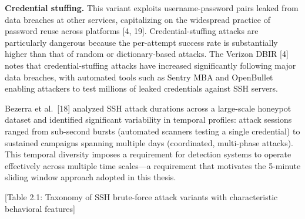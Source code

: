 \documentclass[
  a4paper]{report}
\begin{document}
\textbf{Credential stuffing.} This variant exploits username-password
pairs leaked from data breaches at other services, capitalizing on the
widespread practice of password reuse across platforms {[}4, 19{]}.
Credential-stuffing attacks are particularly dangerous because the
per-attempt success rate is substantially higher than that of random or
dictionary-based attacks. The Verizon DBIR {[}4{]} notes that
credential-stuffing attacks have increased significantly following major
data breaches, with automated tools such as Sentry MBA and OpenBullet
enabling attackers to test millions of leaked credentials against SSH
servers.

Bezerra et al.~{[}18{]} analyzed SSH attack durations across a
large-scale honeypot dataset and identified significant variability in
temporal profiles: attack sessions ranged from sub-second bursts
(automated scanners testing a single credential) to sustained campaigns
spanning multiple days (coordinated, multi-phase attacks). This temporal
diversity imposes a requirement for detection systems to operate
effectively across multiple time scales---a requirement that motivates
the 5-minute sliding window approach adopted in this thesis.

{[}Table 2.1: Taxonomy of SSH brute-force attack variants with
characteristic behavioral features{]}
\end{document}
